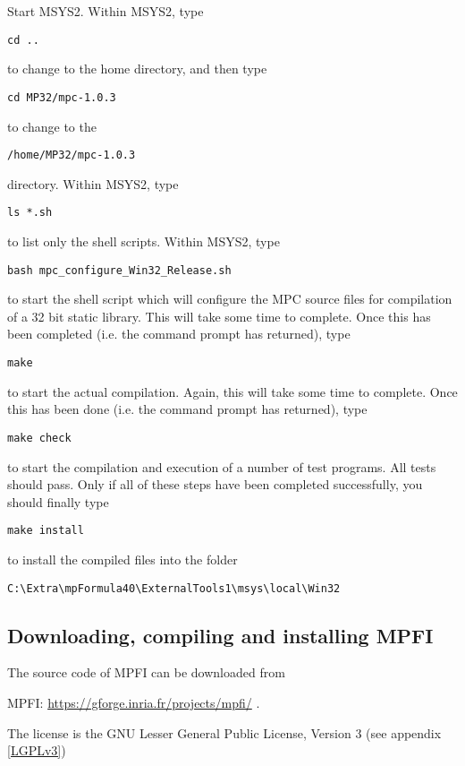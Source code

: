 \vpara
Start MSYS2. Within MSYS2, type
\begin{verbatim}
cd ..
\end{verbatim}
to change to the home directory, and then type 
\begin{verbatim}
cd MP32/mpc-1.0.3
\end{verbatim}
to change to the
\begin{verbatim}
/home/MP32/mpc-1.0.3
\end{verbatim}
directory. Within MSYS2, type
\begin{verbatim}
ls *.sh
\end{verbatim}
to list only the shell scripts. Within MSYS2, type
\begin{verbatim}
bash mpc_configure_Win32_Release.sh
\end{verbatim}
to start the shell script which will configure the MPC source files for compilation of a 32 bit static library. This will take some time to complete. Once this has been completed (i.e. the command prompt has returned), type
\begin{verbatim}
make
\end{verbatim}
to start the actual compilation. Again, this will take some time to complete. Once this has been done (i.e. the command prompt has returned), type
\begin{verbatim}
make check
\end{verbatim}
to start the compilation and execution of a number of test programs. All tests should pass. Only if all of these steps have been completed successfully, you should finally type
\begin{verbatim}
make install
\end{verbatim}
to install the compiled files into the folder
\begin{verbatim}
C:\Extra\mpFormula40\ExternalTools1\msys\local\Win32
\end{verbatim}



\subsection{Downloading, compiling and installing MPFI}
The source code of MPFI can be downloaded from

MPFI: \href{https://gforge.inria.fr/projects/mpfi/}{https://gforge.inria.fr/projects/mpfi/} . 

The license is the GNU Lesser General Public License, Version 3 (see appendix \ref{LGPLv3})

